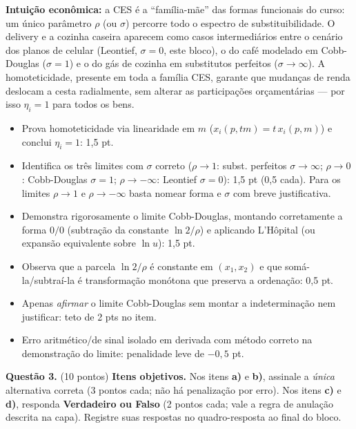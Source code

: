 \begin{solucao}
\textbf{Intuição econômica:} a CES é a ``família-mãe'' das formas funcionais do curso: um único parâmetro $\rho$ (ou $\sigma$) percorre todo o espectro de substituibilidade. O delivery e a cozinha caseira aparecem como casos intermediários entre o cenário dos planos de celular (Leontief, $\sigma=0$, este bloco), o do café modelado em Cobb-Douglas ($\sigma=1$) e o do gás de cozinha em substitutos perfeitos ($\sigma\to\infty$). A homoteticidade, presente em toda a família CES, garante que mudanças de renda deslocam a cesta radialmente, sem alterar as participações orçamentárias --- por isso $\eta_i=1$ para todos os bens.
\rubricalabel
\begin{itemize}
\item Prova homoteticidade via linearidade em $m$ ($x_i(p,tm)=t\,x_i(p,m)$) e conclui $\eta_i=1$: 1{,}5 pt.
\item Identifica os três limites com $\sigma$ correto ($\rho\to1$: subst. perfeitos $\sigma\to\infty$; $\rho\to0$: Cobb-Douglas $\sigma=1$; $\rho\to-\infty$: Leontief $\sigma=0$): 1{,}5 pt (0{,}5 cada). Para os limites $\rho\to1$ e $\rho\to-\infty$ basta nomear forma e $\sigma$ com breve justificativa.
\item Demonstra rigorosamente o limite Cobb-Douglas, montando corretamente a forma $0/0$ (subtração da constante $\ln2/\rho$) e aplicando L'Hôpital (ou expansão equivalente sobre $\ln u$): 1{,}5 pt.
\item Observa que a parcela $\ln2/\rho$ é constante em $(x_1,x_2)$ e que somá-la/subtraí-la é transformação monótona que preserva a ordenação: 0{,}5 pt.
\item Apenas \emph{afirmar} o limite Cobb-Douglas sem montar a indeterminação nem justificar: teto de 2 pts no item.
\item Erro aritmético/de sinal isolado em derivada com método correto na demonstração do limite: penalidade leve de $-0{,}5$ pt.
\end{itemize}
\end{solucao}



\textbf{Questão 3.} (10 pontos) \textbf{Itens objetivos.} Nos itens \textbf{a)} e \textbf{b)}, assinale a \emph{única} alternativa correta (3 pontos cada; não há penalização por erro). Nos itens \textbf{c)} e \textbf{d)}, responda \textbf{Verdadeiro ou Falso} (2 pontos cada; vale a regra de anulação descrita na capa). Registre suas respostas no quadro-resposta ao final do bloco.


